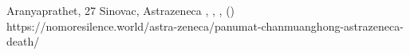          {Aranyaprathet, }
          {27}
          {Sinovac, Astrazeneca}
          {, }
          {
            ,
            ,
             ()
          }
          {https://nomoresilence.world/astra-zeneca/panumat-chanmuanghong-astrazeneca-death/}


